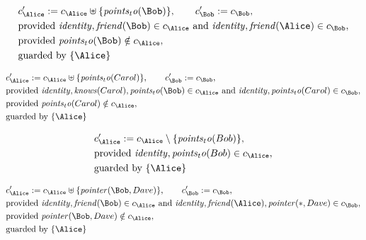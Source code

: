 \begin{align*}
&
c'_
{
\Alice
}
 := 
c_
{
\Alice
}
 \uplus 
\{
\mathit{
points_to
}
(
\Bob
)
\}
, \qquad 
c'_
{
\Bob
}
 := 
c_
{
\Bob
}
,\\
&
\text{provided } 
\mathit{
identity
}
,
\mathit{
friend
}
(
\Bob
)
 \in c_
{
\Alice
}
 \text{ and } 
\mathit{
identity
}
,
\mathit{
friend
}
(
\Alice
)
 \in c_
{
\Bob
}
,\\
&
\text{provided } 
\mathit{
points_to
}
(
\Bob
)
 \notin c_
{
\Alice
}
,\\
&
\text{guarded by } \{
\Alice
\}
\end{align*}

\begin{align*}
&
c'_
{
\Alice
}
 := 
c_
{
\Alice
}
 \uplus 
\{
\mathit{
points_to
}
(
Carol
)
\}
, \qquad 
c'_
{
\Bob
}
 := 
c_
{
\Bob
}
,\\
&
\text{provided } 
\mathit{
identity
}
,
\mathit{
knows
}
(
Carol
)
,
\mathit{
points_to
}
(
\Bob
)
 \in c_
{
\Alice
}
 \text{ and } 
\mathit{
identity
}
,
\mathit{
points_to
}
(
Carol
)
 \in c_
{
\Bob
}
,\\
&
\text{provided } 
\mathit{
points_to
}
(
Carol
)
 \notin c_
{
\Alice
}
,\\
&
\text{guarded by } \{
\Alice
\}
\end{align*}

\begin{align*}
&
c'_
{
\Alice
}
 := 
c_
{
\Alice
}
 \setminus 
\{
\mathit{
points_to
}
(
Bob
)
\}
,\\
&
\text{provided } 
\mathit{
identity
}
,
\mathit{
points_to
}
(
Bob
)
 \in c_
{
\Alice
}
,\\
&
\text{guarded by } \{
\Alice
\}
\end{align*}

\begin{align*}
&
c'_
{
\Alice
}
 := 
c_
{
\Alice
}
 \uplus 
\{
\mathit{
pointer
}
(
\Bob
,
Dave
)
\}
, \qquad 
c'_
{
\Bob
}
 := 
c_
{
\Bob
}
,\\
&
\text{provided } 
\mathit{
identity
}
,
\mathit{
friend
}
(
\Bob
)
 \in c_
{
\Alice
}
 \text{ and } 
\mathit{
identity
}
,
\mathit{
friend
}
(
\Alice
)
,
\mathit{
pointer
}
(
\ast
,
Dave
)
 \in c_
{
\Bob
}
,\\
&
\text{provided } 
\mathit{
pointer
}
(
\Bob
,
Dave
)
 \notin c_
{
\Alice
}
,\\
&
\text{guarded by } \{
\Alice
\}
\end{align*}

